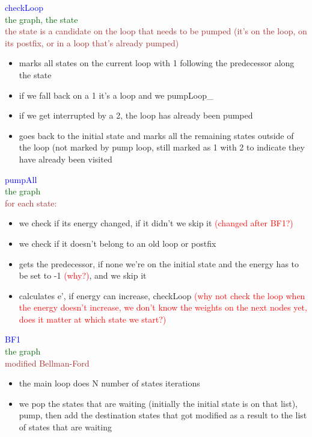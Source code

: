 \documentclass{rapport}
\begin{document}
\vspace{12pt}

\textcolor{blue}{checkLoop}\\
\textcolor[HTML]{006400}{the graph, the state}\\
\textcolor{brown}{the state is a candidate on the loop that needs to be pumped (it’s on the loop, on its postfix, or in a loop that’s already pumped)}
\begin{itemize}
    \item marks all states on the current loop with 1 following the predecessor along the state
    \item if we fall back on a 1 it’s a loop and we pumpLoop\_
    \item if we get interrupted by a 2, the loop has already been pumped
    \item goes back to the initial state and marks all the remaining states outside of the loop (not marked by pump loop, still marked as 1 with 2 to indicate they have already been visited
\end{itemize}

\vspace{12pt}

\textcolor{blue}{pumpAll}\\
\textcolor[HTML]{006400}{the graph}\\
\textcolor{brown}{for each state:}
\begin{itemize}
    \item we check if its energy changed, if it didn’t we skip it \textcolor{red}{(changed after BF1?)}
    \item we check if it doesn’t belong to an old loop or postfix
    \item gets the predecessor, if none we’re on the initial state and the energy has to be set to -1 \textcolor{red}{(why?)}, and we skip it
    \item calculates e’, if energy can increase, checkLoop \textcolor{red}{(why not check the loop when the energy doesn’t increase, we don’t know the weights on the next nodes yet, does it matter at which state we start?)}
\end{itemize}

\vspace{12pt}

\textcolor{blue}{BF1}\\
\textcolor[HTML]{006400}{the graph}\\
\textcolor{brown}{modified Bellman-Ford}
\begin{itemize}
    \item the main loop does N number of states iterations
    \item we pop the states that are waiting (initially the initial state is on that list), pump, then add the destination states that got modified as a result to the list of states that are waiting
\end{itemize}
\end{document}
